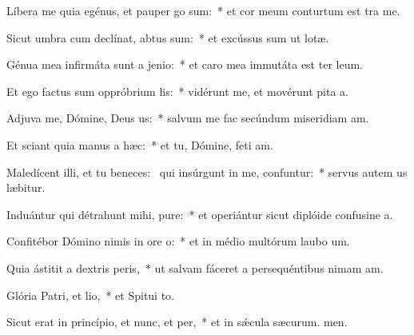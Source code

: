 \item Líbera me quia egénus, et pauper go sum:~* et cor meum conturtum est tra me.
\item Sicut umbra cum declínat, abtus sum:~* et excússus sum ut lotæ.
\item Génua mea infirmáta sunt a jenio:~* et caro mea immutáta est ter leum.
\item Et ego factus sum oppróbrium lis:~* vidérunt me, et movérunt pita a.
\item Adjuva me, Dómine, Deus us:~* salvum me fac secúndum miseridiam am.
\item Et sciant quia manus a hæc:~* et tu, Dómine, feti am.
\item Maledícent illi, et tu beneces:~\pscross{} qui insúrgunt in me, confuntur:~* servus autem us læbitur.
\item Induántur qui détrahunt mihi, pure:~* et operiántur sicut diplóide confusine a.
\item Confitébor Dómino nimis in ore o:~* et in médio multórum laubo um.
\item Quia ástitit a dextris peris,~* ut salvam fáceret a persequéntibus nimam am.
\item Glória Patri, et lio,~* et Spitui to.
\item Sicut erat in princípio, et nunc, et per,~* et in sǽcula sæcurum. men.
